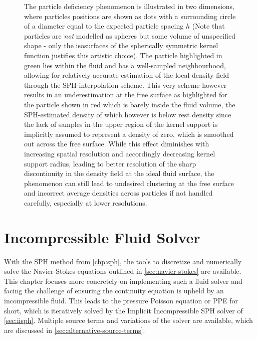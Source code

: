 \documentclass[oneside, a4paper]{book}
\begin{document}
  \begin{figure}
    \centering
    \caption{The particle deficiency phenomenon is illustrated in two dimensions, where particles positions are shown as dots with a surrounding circle of a diameter equal to the expected particle spacing $h$ (Note that particles are \textit{not} modelled as spheres but some volume of unspecified shape - only the isosurfaces of the spherically symmetric kernel function justifies this artistic choice). The particle highlighted in green lies within the fluid and has a well-sampled neighbourhood, allowing for relatively accurate estimation of the local density field through the SPH interpolation scheme. This very scheme however results in an underestimation at the free surface as highlighted for the particle shown in red which is barely inside the fluid volume, the SPH-estimated density of which however is below rest density since the lack of samples in the upper region of the kernel support is implicitly assumed to represent a density of zero, which is smoothed out across the free surface. While this effect diminishes with increasing spatial resolution and accordingly decreasing kernel support radius, leading to better resolution of the sharp discontinuity in the density field at the ideal fluid surface, the phenomenon can still lead to undesired clustering at the free surface and incorrect average densities across particles if not handled carefully, especially at lower resolutions.}
    \label{fig:particle-deficiency}
  \end{figure}
    


\chapter{Incompressible Fluid Solver}\label{chp:fluid}
  With the SPH method from \autoref{chp:sph}, the tools to discretize and numerically solve the Navier-Stokes equations outlined in \autoref{sec:navier-stokes} are available. This chapter focuses more concretely on implementing such a fluid solver and facing the challenge of ensuring the continuity equation is upheld by an incompressible fluid. This leads to the pressure Poisson equation or PPE for short, which is iteratively solved by the Implicit Incompressible SPH solver of \autoref{sec:iisph}. Multiple source terms and variations of the solver are available, which are discussed in \autoref{sec:alternative-source-terms}.
\end{document}
